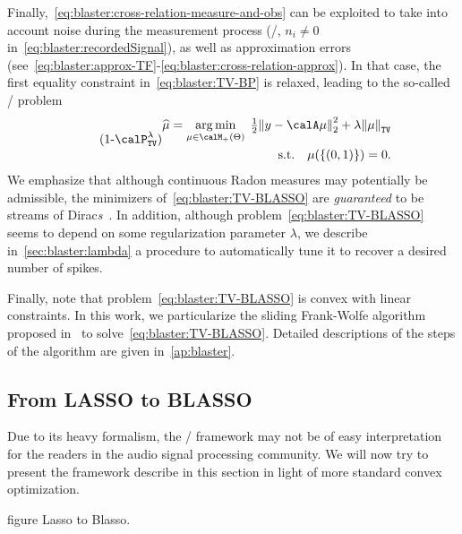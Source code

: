 \mynewline
Finally,~\cref{eq:blaster:cross-relation-measure-and-obs} can be exploited to take into account noise during the measurement process (\ie/,  $n_i\neq0$ in~\cref{eq:blaster:recordedSignal}), as well as approximation errors  (see~\cref{eq:blaster:approx-TF}-\cref{eq:blaster:cross-relation-approx}).
In that case, the first equality constraint in~\eqref{eq:blaster:TV-BP} is relaxed, leading to the so-called \BLASSO/ problem
\begin{equation}
    \stepcounter{equation}
    \tag{\theequation-$\calP^\lambda_{\text{\texttt{TV}}}$}
    \label{eq:blaster:TV-BLASSO}
    \begin{split}
    \widehat{\mu}
    =
    \kargmin_{\mu \in\posDisRadonMeasure}
    \;
    \tfrac{1}{2} \kvvbar{
        y - \opObs\mu
    }_2^2
    +
    \lambda\normTV{
        \mu
    }
    \\
    \quad
    \text{s.t.}
    \quad
    \mu(\{(0, 1)\}) = 0
    .
    \end{split}
\end{equation}
We emphasize that although continuous Radon measures may potentially be admissible, the minimizers of~\cref{eq:blaster:TV-BLASSO} are \emph{guaranteed} to be streams of Dirac\textit{s}~.
In addition, although problem~\cref{eq:blaster:TV-BLASSO} seems to depend on some regularization parameter $\lambda$, we describe in~\cref{sec:blaster:lambda} a procedure to automatically tune it to recover a desired number of spikes.

\mynewline
Finally, note that problem~\cref{eq:blaster:TV-BLASSO} is convex with linear constraints.
In this work, we particularize the sliding Frank-Wolfe algorithm proposed in~ to solve~\cref{eq:blaster:TV-BLASSO}.
Detailed descriptions of the steps of the algorithm are given in~\cref{ap:blaster}.

\subsection{From LASSO to BLASSO}
Due to its heavy formalism, the \CD/ framework may not be of easy interpretation for the readers in the audio signal processing community.
We will now try to present the framework describe in this section in light of more standard convex optimization.

figure Lasso to Blasso.


